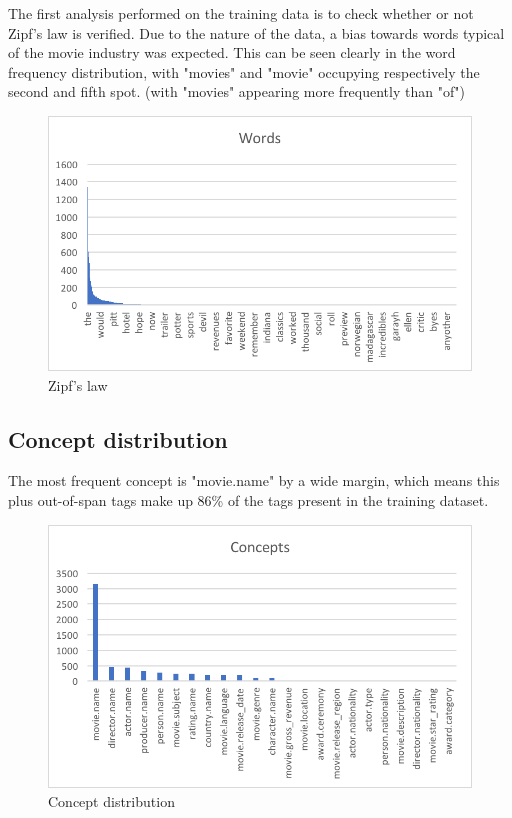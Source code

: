 \documentclass[11pt,a4paper]{article}
\begin{document}
The first analysis performed on the training data is to check whether or not Zipf's law is verified.
Due to the nature of the data, a bias towards words typical of the movie industry was expected.
This can be seen clearly in the word frequency distribution, with "movies" and "movie" occupying respectively the second and fifth spot.
(with "movies" appearing more frequently than "of")

\begin{figure}[h]
\centering
  \includegraphics[width=.9\linewidth]{Images/zipf}
  \caption{Zipf's law}
\label{fig:zipf}
\end{figure}


\subsection{Concept distribution}

The most frequent concept is "movie.name" by a wide margin, which means this plus out-of-span tags make up 86\% of the tags present in the training dataset.

\begin{figure}[h]
\centering
  \includegraphics[width=.9\linewidth]{Images/concepts}
  \caption{Concept distribution}
\label{fig:concepts}
\end{figure}
\end{document}
